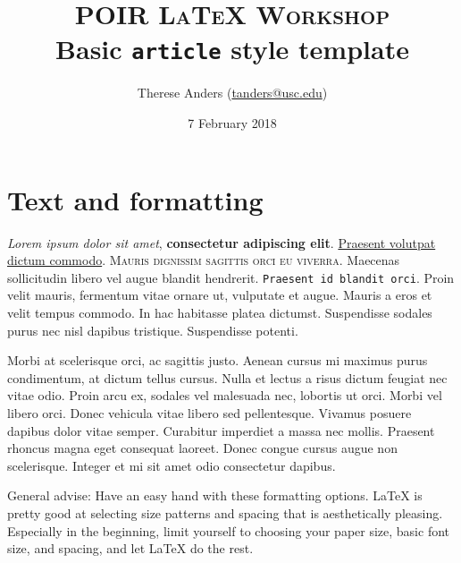 \documentclass[11pt,letterpaper,oneside]{article} %
\begin{document}
\pagestyle{plain} %
\title{\small\textsc{POIR {\LaTeX} Workshop} \\
	\Large{Basic \texttt{article} style template}}
\author{Therese Anders (\href{mailto:tanders@usc.edu}{tanders@usc.edu})} 
\date{7 February 2018}
\maketitle %

\singlespacing

\tableofcontents %

\newpage %
\section{Text and formatting}
\doublespacing
\textit{Lorem ipsum dolor sit amet}, \textbf{consectetur adipiscing elit}. \underline{Praesent volutpat dictum commodo}. \textsc{Mauris dignissim sagittis orci eu viverra}. Maecenas sollicitudin libero vel augue blandit hendrerit. \texttt{Praesent id blandit orci}. Proin velit mauris, fermentum vitae ornare ut, vulputate et augue. Mauris a eros et velit tempus commodo. In hac habitasse platea dictumst. Suspendisse sodales purus nec nisl dapibus tristique. Suspendisse potenti.

\singlespacing
Morbi at scelerisque orci, ac sagittis justo. Aenean cursus mi maximus purus condimentum, at dictum tellus cursus. Nulla et lectus a risus dictum feugiat nec vitae odio. Proin arcu ex, sodales vel malesuada nec, lobortis ut orci. Morbi vel libero orci. Donec vehicula vitae libero sed pellentesque. Vivamus posuere dapibus dolor vitae semper. Curabitur imperdiet a massa nec mollis. Praesent rhoncus magna eget consequat laoreet. Donec congue cursus augue non scelerisque. {\tiny Integer et mi sit amet odio consectetur}                dapibus. %

\begin{Large} %
\begin{center}
General advise: Have an easy hand with these formatting options. {\LaTeX} is pretty good at selecting size patterns and spacing that is aesthetically pleasing. Especially in the beginning, limit yourself to choosing your paper size, basic font size, and spacing, and let {\LaTeX} do the rest.
\end{center}
\end{Large}
\end{document}

